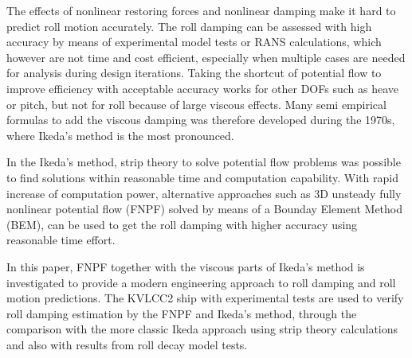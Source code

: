 
The effects of nonlinear restoring forces and nonlinear damping make it hard to predict roll motion accurately. The roll damping can be assessed with high accuracy by means of experimental model tests or RANS calculations, which however are not time and cost efficient, especially when multiple cases are needed for analysis during design iterations. Taking the shortcut of potential flow to improve efficiency with acceptable accuracy works for other DOFs such as heave or pitch, but not for roll because of large viscous effects. Many semi empirical formulas to add the viscous damping was therefore developed during the 1970s, where Ikeda's method is the most pronounced. 

In the Ikeda's method, strip theory to solve potential flow problems was possible to find solutions within reasonable time and computation capability. With rapid increase of computation power, alternative approaches such as 3D unsteady fully nonlinear potential flow (FNPF) solved by means of a Bounday Element Method (BEM), can be used to get the roll damping with higher accuracy using reasonable time effort. 

In this paper, FNPF together with the viscous parts of Ikeda's method is investigated to provide a modern engineering approach to roll damping and roll motion predictions. The KVLCC2 ship with experimental tests are used to verify roll damping estimation by the FNPF and Ikeda's method, through the comparison with the more classic Ikeda approach using strip theory calculations and also with results from roll decay model tests.   



